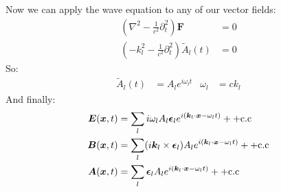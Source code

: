 Now we can apply the wave equation to any of our vector fields:
\begin{align*}
	\left(\nabla^2 - \frac{1}{c^2}\partial_t^2\right)\bm{F} &= 0 \\
	\left(-k_l^2 - \frac{1}{c^2}\partial_t^2\right)\tilde{A}_l(t) &= 0
\end{align*}
So:
\begin{align*}
	\tilde{A}_l(t) &= A_l e^{i\omega_l t} & \omega_l &= c k_l
\end{align*}
And finally:
\begin{align*}
	\bm{E}(\bm{x},t) &= \sum_l i\omega_lA_l \bm{\epsilon}_l e^{i(\bm{k}_l\cdot\bm{x} -\omega_l t)} + +\text{c.c} \\
	\bm{B}(\bm{x},t) &= \sum_l (i\bm{k}_l\times\bm{\epsilon}_l)A_l e^{i(\bm{k}_l\cdot\bm{x} - \omega_l t)} + +\text{c.c} \\
	\bm{A}(\bm{x},t) &= \sum_l \bm{\epsilon}_l A_l e^{i(\bm{k}_l\cdot\bm{x} -\omega_l t)} + +\text{c.c}
\end{align*}
